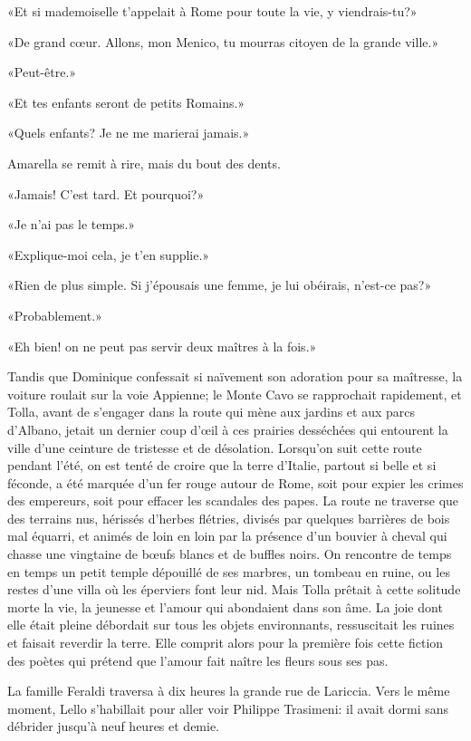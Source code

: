 «Et si mademoiselle t'appelait à Rome pour toute la vie, y
viendrais-tu?»

«De grand cœur. Allons, mon Menico, tu mourras citoyen de la grande
ville.»

«Peut-être.»

«Et tes enfants seront de petits Romains.»

«Quels enfants? Je ne me marierai jamais.»

Amarella se remit à rire, mais du bout des dents.

«Jamais! C'est tard. Et pourquoi?»

«Je n'ai pas le temps.»

«Explique-moi cela, je t'en supplie.»

«Rien de plus simple. Si j'épousais une femme, je lui obéirais, n'est-ce
pas?»

«Probablement.»

«Eh bien! on ne peut pas servir deux maîtres à la fois.»

Tandis que Dominique confessait si naïvement son adoration pour sa
maîtresse, la voiture roulait sur la voie Appienne; le Monte Cavo se
rapprochait rapidement, et Tolla, avant de s'engager dans la route qui
mène aux jardins et aux parcs d'Albano, jetait un dernier coup d'œil à
ces prairies desséchées qui entourent la ville d'une ceinture de
tristesse et de désolation. Lorsqu'on suit cette route pendant l'été, on
est tenté de croire que la terre d'Italie, partout si belle et si
féconde, a été marquée d'un fer rouge autour de Rome, soit pour expier
les crimes des empereurs, soit pour effacer les scandales des papes. La
route ne traverse que des terrains nus, hérissés d'herbes flétries,
divisés par quelques barrières de bois mal équarri, et animés de loin en
loin par la présence d'un bouvier à cheval qui chasse une vingtaine de
bœufs blancs et de buffles noirs. On rencontre de temps en temps un
petit temple dépouillé de ses marbres, un tombeau en ruine, ou les
restes d'une villa où les éperviers font leur nid. Mais Tolla prêtait à
cette solitude morte la vie, la jeunesse et l'amour qui abondaient dans
son âme. La joie dont elle était pleine débordait sur tous les objets
environnants, ressuscitait les ruines et faisait reverdir la terre. Elle
comprit alors pour la première fois cette fiction des poètes qui prétend
que l'amour fait naître les fleurs sous ses pas.

La famille Feraldi traversa à dix heures la grande rue de Lariccia. Vers
le même moment, Lello s'habillait pour aller voir Philippe Trasimeni: il
avait dormi sans débrider jusqu'à neuf heures et demie.

